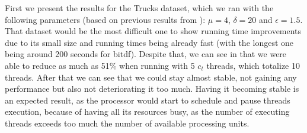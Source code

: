 {First we present the results for the Trucks dataset, which we ran with the following parameters (based on previous
results from ): $\mu=4$, $\delta=20$ and $\epsilon=1.5$. That dataset would be the most difficult one
to show running time improvements due to its small size and running times being already fast (with the longest one being
around 200 seconds for \ac{bitdf}). Despite that, we can see in  that we were able to reduce
as much as 51\% when running with 5 $c_t$ threads, which totalize 10 threads. After that we can see that we could stay
almost stable, not gaining any performance but also not deteriorating it too much. Having it becoming stable is an
expected result, as the processor would start to schedule and pause threads execution, because of having all its
resources busy, as the number of executing threads exceeds too much the number of available processing units.

}
